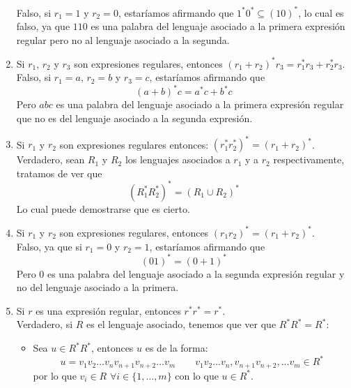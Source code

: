 \begin{enumerate}
        Falso, si $r_1 = 1$ y $r_2 = 0$, estaríamos afirmando que $1^\ast 0^\ast \subseteq {(10)}^{\ast}$, lo cual es falso, ya que $110$ es una palabra del lenguaje asociado a la primera expresión regular pero no al lenguaje asociado a la segunda.
    \item Si $r_1$, $r_2$ y $r_3$ son expresiones regulares, entonces ${(r_1+r_2)}^{\ast}r_3=r_1^\ast r_3 + r_2^\ast r_3$.\\

        Falso, si $r_1 = a$, $r_2 = b$ y $r_3 = c$, estaríamos afirmando que 
        \begin{equation*}
            {(a+b)}^{\ast}c = a^\ast c + b^\ast c
        \end{equation*}
        Pero $abc$ es una palabra del lenguaje asociado a la primera expresión regular que no es del lenguaje asociado a la segunda expresión.
    \item Si $r_1$ y $r_2$ son expresiones regulares entonces: ${(r_1^\ast r_2^\ast)}^{\ast}={(r_1+r_2)}^{\ast}$.\\

        Verdadero, sean $R_1$ y $R_2$ los lenguajes asociados a $r_1$ y a $r_2$ respectivamente, tratamos de ver que
        \begin{equation*}
            {(R_1^\ast R_2^\ast)}^{\ast} = {(R_1\cup R_2)}^{\ast}
        \end{equation*}
        Lo cual puede demostrarse que es cierto.
    \item Si $r_1$ y $r_2$ son expresiones regulares, entonces ${(r_1r_2)}^{\ast}={(r_1+r_2)}^{\ast}$.\\

        Falso, ya que si $r_1 = 0$ y $r_2 = 1$, estaríamos afirmando que 
        \begin{equation*}
            {(01)}^{\ast} = {(0+1)}^{\ast}
        \end{equation*}
        Pero $0$ es una palabra del lenguaje asociado a la segunda expresión regular y no del lenguaje asociado a la primera.
    \item Si $r$ es una expresión regular, entonces $r^\ast r^\ast = r^\ast$.\\

        Verdadero, si $R$ es el lenguaje asociado, tenemos que ver que $R^\ast R^\ast = R^\ast$:
        \begin{itemize}
            \item Sea $u\in R^\ast R^\ast$, entonces $u$ es de la forma:
                \begin{equation*}
                    u = v_1v_2\ldots v_nv_{n+1}v_{n+2}\ldots v_m \qquad v_1v_2\ldots v_n, v_{n+1}v_{n+2},\ldots v_m \in R^\ast
                \end{equation*}
                por lo que $v_i \in R$ $\forall i \in \{1,\ldots, m\}$ con lo que $u\in R^\ast$.


\end{itemize}
\end{enumerate}
